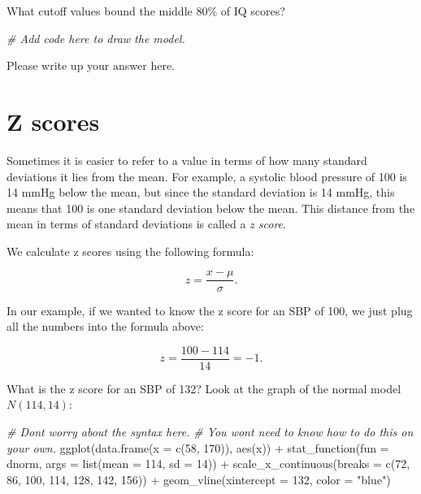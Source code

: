 \documentclass[
]{book}
\newenvironment{Shaded}{\begin{snugshade}}{\end{snugshade}}
\newcommand{\AttributeTok}[1]{\textcolor[rgb]{0.77,0.63,0.00}{#1}}
\newcommand{\CommentTok}[1]{\textcolor[rgb]{0.56,0.35,0.01}{\textit{#1}}}
\newcommand{\DecValTok}[1]{\textcolor[rgb]{0.00,0.00,0.81}{#1}}
\newcommand{\FunctionTok}[1]{\textcolor[rgb]{0.00,0.00,0.00}{#1}}
\newcommand{\NormalTok}[1]{#1}
\newcommand{\SpecialCharTok}[1]{\textcolor[rgb]{0.00,0.00,0.00}{#1}}
\newcommand{\StringTok}[1]{\textcolor[rgb]{0.31,0.60,0.02}{#1}}
\begin{document}
What cutoff values bound the middle 80\% of IQ scores?

\begin{Shaded}
\begin{Highlighting}[]
\CommentTok{\# Add code here to draw the model.}
\end{Highlighting}
\end{Shaded}

Please write up your answer here.

\hypertarget{normal-z}{%
\section{Z scores}\label{normal-z}}

Sometimes it is easier to refer to a value in terms of how many standard deviations it lies from the mean. For example, a systolic blood pressure of 100 is 14 mmHg below the mean, but since the standard deviation is 14 mmHg, this means that 100 is one standard deviation below the mean. This distance from the mean in terms of standard deviations is called a \emph{z score}.

We calculate z scores using the following formula:

\[
z = \frac{x - \mu}{\sigma}.
\]

In our example, if we wanted to know the z score for an SBP of 100, we just plug all the numbers into the formula above:

\[
z = \frac{100 - 114}{14} = -1.
\]

What is the z score for an SBP of 132? Look at the graph of the normal model \(N(114, 14)\):

\begin{Shaded}
\begin{Highlighting}[]
\CommentTok{\# Don\textquotesingle{}t worry about the syntax here.}
\CommentTok{\# You won\textquotesingle{}t need to know how to do this on your own.}
\FunctionTok{ggplot}\NormalTok{(}\FunctionTok{data.frame}\NormalTok{(}\AttributeTok{x =} \FunctionTok{c}\NormalTok{(}\DecValTok{58}\NormalTok{, }\DecValTok{170}\NormalTok{)), }\FunctionTok{aes}\NormalTok{(x)) }\SpecialCharTok{+}
    \FunctionTok{stat\_function}\NormalTok{(}\AttributeTok{fun =}\NormalTok{ dnorm, }\AttributeTok{args =} \FunctionTok{list}\NormalTok{(}\AttributeTok{mean =} \DecValTok{114}\NormalTok{, }\AttributeTok{sd =} \DecValTok{14}\NormalTok{)) }\SpecialCharTok{+}
    \FunctionTok{scale\_x\_continuous}\NormalTok{(}\AttributeTok{breaks =} \FunctionTok{c}\NormalTok{(}\DecValTok{72}\NormalTok{, }\DecValTok{86}\NormalTok{, }\DecValTok{100}\NormalTok{, }\DecValTok{114}\NormalTok{, }\DecValTok{128}\NormalTok{, }\DecValTok{142}\NormalTok{, }\DecValTok{156}\NormalTok{)) }\SpecialCharTok{+}
    \FunctionTok{geom\_vline}\NormalTok{(}\AttributeTok{xintercept =} \DecValTok{132}\NormalTok{, }\AttributeTok{color =} \StringTok{"blue"}\NormalTok{)}
\end{Highlighting}
\end{Shaded}
\end{document}
